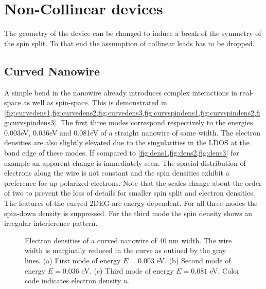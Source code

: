 \section{Non-Collinear devices}
The geometry of the device can be changed to induce a break of the symmetry of the spin split. To that end the assumption of collinear leads has to be dropped.
\subsection{Curved Nanowire}
A simple bend in the nanowire already introduces complex interactions in real-space as well as spin-space. This is demonstrated in \cref{fig:curvedens1,fig:curvedens2,fig:curvedens3,fig:curvspindens1,fig:curvspindens2,fig:curvspindens3}. The first three modes correspond respectively to the energies 0.003eV, 0.036eV and 0.081eV of a straight nanowire of same width. The electron densities are also slightly elevated due to the singularities in the LDOS at the band edge of these modes. If compared to \cref{fig:dens1,fig:dens2,fig:dens3} for example an apparent change is immediately seen. The spacial distribution of electrons along the wire is not constant and the spin densities exhibit a preference for up polarized electrons. Note that the scales change about the order of two to prevent the loss of details for smaller spin split and electron densities. The features of the curved 2DEG are energy dependent. For all three modes the spin-down density is suppressed. For the third mode the spin density shows an irregular interference pattern.\par
\begin{figure}[h!]
\caption{Electron densities of a curved nanowire of 40 nm width. The wire width is marginally reduced in the curve as outined by the gray lines. (a) First mode of energy $E=0.003$ eV. (b) Second mode of energy $E=0.036$ eV. (c) Third mode of energy $E=0.081$ eV. Color code indicates electron density $n$.}
\end{figure}
